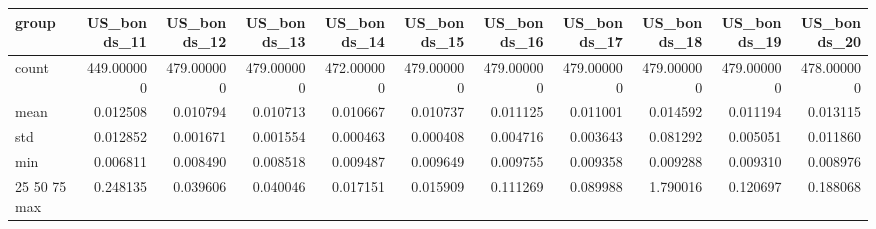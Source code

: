 \begin{tabular}{lrrrrrrrrrr}
\toprule
group & US_bonds_11 & US_bonds_12 & US_bonds_13 & US_bonds_14 & US_bonds_15 & US_bonds_16 & US_bonds_17 & US_bonds_18 & US_bonds_19 & US_bonds_20 \\
\midrule
count & 449.000000 & 479.000000 & 479.000000 & 472.000000 & 479.000000 & 479.000000 & 479.000000 & 479.000000 & 479.000000 & 478.000000 \\
mean & 0.012508 & 0.010794 & 0.010713 & 0.010667 & 0.010737 & 0.011125 & 0.011001 & 0.014592 & 0.011194 & 0.013115 \\
std & 0.012852 & 0.001671 & 0.001554 & 0.000463 & 0.000408 & 0.004716 & 0.003643 & 0.081292 & 0.005051 & 0.011860 \\
min & 0.006811 & 0.008490 & 0.008518 & 0.009487 & 0.009649 & 0.009755 & 0.009358 & 0.009288 & 0.009310 & 0.008976 \\
25%
50%
75%
max & 0.248135 & 0.039606 & 0.040046 & 0.017151 & 0.015909 & 0.111269 & 0.089988 & 1.790016 & 0.120697 & 0.188068 \\
\bottomrule
\end{tabular}
